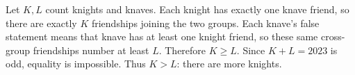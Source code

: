 Let $K,L$ count knights and knaves. Each knight has exactly one knave friend, so there are exactly $K$ friendships joining the two groups. Each knave's false statement means that knave has at least one knight friend, so these same cross-group friendships number at least $L$. Therefore $K\ge L$. Since $K+L=2023$ is odd, equality is impossible. Thus $\boxed{K>L}$: there are more knights.
